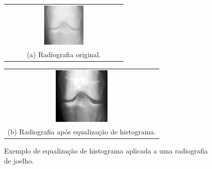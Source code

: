 \begin{figure}[!htbp]
    \centering
    \begin{tabular}{@{}c@{}}
        \includegraphics[width=0.35\textwidth]{figs/imagem-nao-equalizada.png} \\[\abovecaptionskip]
        \small (a) Radiografia original.
    \end{tabular}
    \hfill
    \begin{tabular}{@{}c@{}}
        \includegraphics[width=0.35\textwidth]{figs/image-equalizada.png} \\[\abovecaptionskip]
        \small (b) Radiografia após equalização de histograma.
    \end{tabular}
    \caption{Exemplo de equalização de histograma aplicada a uma radiografia de joelho.}
    \label{fig:histogram-equalization}
\end{figure}

